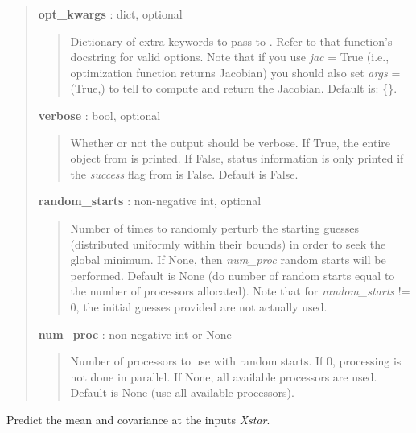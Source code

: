 \documentclass[letterpaper,10pt,english]{sphinxmanual}
\begin{document}
\begin{fulllineitems}
\begin{fulllineitems}
\begin{quote}
\begin{description}
\textbf{opt\_kwargs} : dict, optional
\begin{quote}

Dictionary of extra keywords to pass to
. Refer to that function's
docstring for valid options. Note that if you use \emph{jac} = True (i.e.,
optimization function returns Jacobian) you should also set \emph{args}
= (True,) to tell {\hyperref[gptools:gptools.gaussian_process.GaussianProcess.update_hyperparameters]{}} to compute and
return the Jacobian. Default is: \{\}.
\end{quote}

\textbf{verbose} : bool, optional
\begin{quote}

Whether or not the output should be verbose. If True, the entire
 object from  is
printed. If False, status information is only printed if the
\emph{success} flag from  is False. Default is False.
\end{quote}

\textbf{random\_starts} : non-negative int, optional
\begin{quote}

Number of times to randomly perturb the starting guesses
(distributed uniformly within their bounds) in order to seek the
global minimum. If None, then \emph{num\_proc} random starts will be
performed. Default is None (do number of random starts equal to the
number of processors allocated). Note that for \emph{random\_starts} != 0,
the initial guesses provided are not actually used.
\end{quote}

\textbf{num\_proc} : non-negative int or None
\begin{quote}

Number of processors to use with random starts. If 0, processing is
not done in parallel. If None, all available processors are used.
Default is None (use all available processors).
\end{quote}

\end{description}\end{quote}

\end{fulllineitems}


\begin{fulllineitems}
\label{gptools:gptools.gaussian_process.GaussianProcess.predict}
Predict the mean and covariance at the inputs \emph{Xstar}.


\end{fulllineitems}
\end{fulllineitems}
\end{document}

